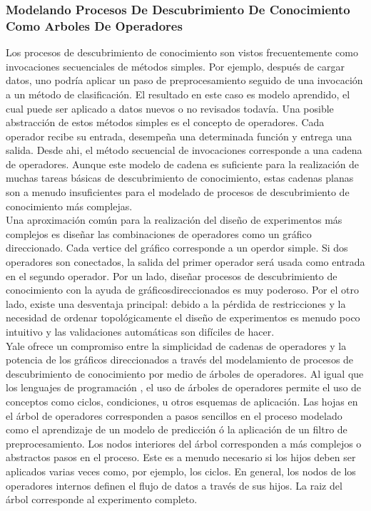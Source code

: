 \subsubsection{Modelando Procesos De Descubrimiento De Conocimiento Como Arboles De Operadores}

Los procesos de descubrimiento de conocimiento son vistos frecuentemente como invocaciones secuenciales de
m\'etodos simples.  Por ejemplo, des\-pu\'es de cargar datos, uno podr\'ia aplicar un paso de preprocesamiento
seguido de una invocaci\'on a un m\'etodo de clasificaci\'on.  El resultado en este caso es modelo aprendido,
el cual puede ser aplicado a datos nuevos o no revisados todav\'ia.  Una posible abstracci\'on de estos m\'etodos
simples es el concepto de operadores. Cada operador recibe su entrada, desempe\~na una determinada funci\'on y
entrega una salida. Desde ahi, el m\'etodo secuencial de invocaciones corresponde a una cadena de operadores. 
Aunque este modelo de cadena es suficiente para la realizaci\'on de muchas tareas b\'asicas de descubrimiento de
conocimiento,  estas cadenas planas son a menudo insuficientes para el mo\-delado de procesos de descubrimiento de
conocimiento m\'as complejas.\\

Una aproximaci\'on com\'un para la realizaci\'on del dise\~no de experimentos m\'as complejos es dise\~nar las
combinaciones de operadores como un gr\'afico direccionado.  Cada vertice del gr\'afico corresponde a un operdor
simple. Si dos operadores son conectados, la salida del primer operador ser\'a usada como entrada en el segundo
operador.  Por un lado, dise\~nar procesos de des\-cubrimiento de conocimiento con la ayuda de
gr\'aficosdireccionados es muy poderoso.  Por el otro lado, existe una desventaja principal: debido a la
p\'erdida de restricciones y la necesidad de ordenar topol\'ogicamente el dise\~no de experimentos es menudo poco
intuitivo y las validaciones autom\'aticas son dif\'iciles de hacer.\\

Yale ofrece un compromiso entre la simplicidad de cadenas de operadores y la potencia de los gr\'aficos
direccionados a trav\'es del modelamiento de procesos de descubrimiento de conocimiento por medio de \'arboles de
operadores. Al igual que los lenguajes de programaci\'on , el uso de \'arboles de operadores permite el uso de
conceptos como ciclos, condiciones, u otros esquemas de aplicaci\'on.  Las hojas en el \'arbol de operadores
corresponden a pasos senci\-llos en el proceso modelado como el aprendizaje de un modelo de predicci\'on \'o la
aplicaci\'on de un filtro de preprocesamiento. Los nodos interiores del \'arbol corresponden a m\'as complejos o
abstractos pasos en el proceso.  Este es a menudo necesario si los hijos deben ser aplicados varias veces como,
por ejemplo, los ciclos.  En general, los nodos de los operadores internos definen el flujo de datos a trav\'es
de sus hijos. La raiz del \'arbol corresponde al experimento completo.

